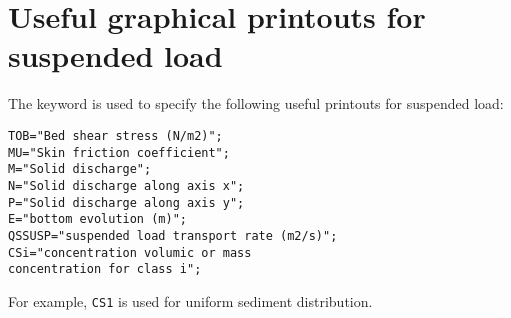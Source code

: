 \section{Useful graphical printouts for suspended load}
The keyword  is used to specify the following useful printouts for suspended load:
\begin{lstlisting}[frame=trBL]
TOB="Bed shear stress (N/m2)";
MU="Skin friction coefficient";
M="Solid discharge";
N="Solid discharge along axis x";
P="Solid discharge along axis y";
E="bottom evolution (m)";
QSSUSP="suspended load transport rate (m2/s)";
CSi="concentration volumic or mass 
concentration for class i";
\end{lstlisting}
For example, \texttt{CS1} is used for uniform sediment distribution.
